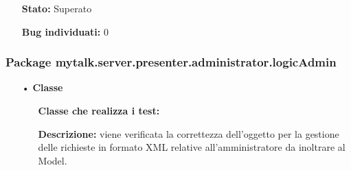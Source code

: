 {\begin{sloppypar}
{\begin{itemize}
\begin{itemize}
\begin{itemize}
						\item \texttt{testExtractStatReq()}: si verifica la corretta estrazione delle informazioni di riferimento per l'estrazione delle statistiche. Viene richiamato il metodo \texttt{extractStatReq(Element e)} della classe \texttt{XMLField} per quattro volte. In tutti i casi inizialmente viene chiamato il metodo \texttt{loadXMLFromString(String xml)} passandogli un particolare parametro \texttt{xml} e sull'oggetto \texttt{Document} ottenuto viene ricavato l'oggetto \texttt{e} che rappresenta l'elemento XML da passare come parametro al metodo \texttt{extractStatReq(Element e)}. La prima volta \texttt{xml} contiene l'attributo \texttt{time} e l'elemento \texttt{email} corretti, la seconda volta contiene l'attributo \texttt{time} e l'elemento \texttt{grade} corretti, la terza volta contiene l'attributo \texttt{time} e l'elemento \texttt{dateStart} corretti e la quarta non contiene nessun elemento e nessun attributo. Viene verificato che il metodo ritorni l'oggetto corretto.
					\end{itemize}
					\item[] \textbf{Stato:} Superato

					\item[] \textbf{Bug individuati:} 0
				\end{itemize}	
			\end{itemize}

		}
		
		\subsubsection{Package mytalk.server.presenter.administrator.logicAdmin} {
			\begin{itemize}
				\item[•]\textbf{Classe } 
				\begin{itemize}
					\item[] \textbf{Classe che realizza i test:} \\ 

					\item[] \textbf{Descrizione:} viene verificata la correttezza dell'oggetto per la gestione delle richieste in formato XML relative all'amministratore da inoltrare al Model.


\end{itemize}
\end{itemize}}
\end{sloppypar}}
